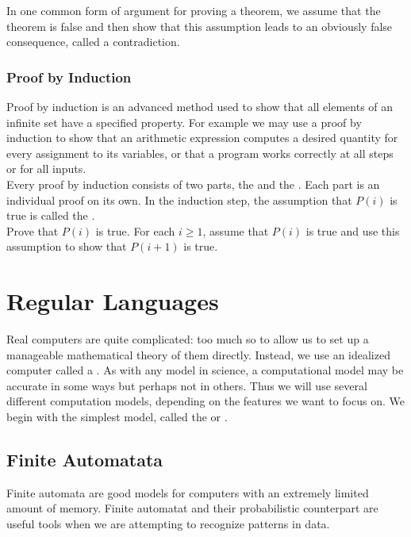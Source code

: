 \documentclass{article}
\begin{document}
In one common form of argument for proving a theorem, we assume that the theorem is false and then show that this assumption leads to an obviously false consequence, called a contradiction. 

\subsubsection{Proof by Induction}

Proof by induction is an advanced method used to show that all elements of an infinite set have a specified property. For example we may use a proof by induction to show that an arithmetic expression computes a desired quantity for every assignment to its variables, or that a program works correctly at all steps or for all inputs. \\ 

Every proof by induction consists of two parts, the  and the . Each part is an individual proof on its own. In the induction step, the assumption that $P(i)$ is true is called the . \\

 Prove that $P(i)$ is true. 
 For each $i \geq 1$, assume that $P(i)$ is true and use this assumption to show that $P(i+1)$ is true. \\ 

\section{Regular Languages}

Real computers are quite complicated: too much so to allow us to set up a manageable mathematical theory of them directly. Instead, we use an idealized computer called a . As with any model in science, a computational model may be accurate in some ways but perhaps not in others. Thus we will use several different computation models, depending on the features we want to focus on. We begin with the simplest model, called the  or . 

\subsection{Finite Automatata}

Finite automata are good models for computers with an extremely limited amount of memory. Finite automatat and their probabilistic counterpart  are useful tools when we are attempting to recognize patterns in data. \\ 
\end{document}
